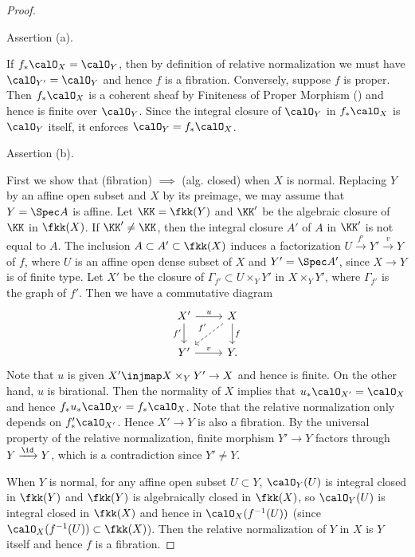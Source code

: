 \begin{proof}
	\hspace{1em}
	\begin{step}
		Assertion (a).
	\end{step}

	If $f_*\calO_X = \calO_Y$, then by definition of relative normalization we must have $\calO_{Y'} = \calO_Y$ and hence $f$ is a fibration.
	Conversely, suppose $f$ is proper.
	Then $f_*\calO_X$ is a coherent sheaf by Finiteness of Proper Morphism (\cite[\href{https://stacks.math.columbia.edu/tag/02O5}{Tag 02O5}]{Stacks}) and hence is finite over $\calO_Y$.
	Since the integral closure of $\calO_Y$ in $f_*\calO_X$ is $\calO_Y$ itself, it enforces $\calO_Y = f_*\calO_X$.

	\begin{step}
		Assertion (b).
	\end{step}

	First we show that (fibration) $\implies$ (alg. closed) when $X$ is normal.
	Replacing $Y$ by an affine open subset and $X$ by its preimage, we may assume that $Y = \Spec A$ is affine.
	Let $\KK = \fkk(Y)$ and $\KK'$ be the algebraic closure of $\KK$ in $\fkk(X)$.
	If $\KK' \neq \KK$, then the integral closure $A'$ of $A$ in $\KK'$ is not equal to $A$.
	The inclusion $A \subset A' \subset \fkk(X)$ induces a factorization $U \xrightarrow{f'} Y' \xrightarrow{v} Y$ of $f$, where $U$ is an affine open dense subset of $X$ and $Y' = \Spec A'$, since $X \to Y$ is of finite type.
	Let $X'$ be the closure of $\Gamma_{f'} \subset U \times_Y Y'$ in $X \times_Y Y'$, where $\Gamma_{f'}$ is the graph of $f'$.
	Then we have a commutative diagram
	\[
		\begin{tikzcd}
			X' \ar[r, "u"] \ar[d,"f'"'] & X \ar[d, "f"] \ar[ld, dashed, "f'"'] \\
			Y' \ar[r, "v"] & Y.
		\end{tikzcd}
	\]
	Note that $u$ is given $X' \injmap X \times_Y Y' \to X$ and hence is finite.
	On the other hand, $u$ is birational.
	Then the normality of $X$ implies that $u_* \calO_{X'} = \calO_X$ and hence $f_* u_* \calO_{X'} = f_* \calO_X$.
	Note that the relative normalization only depends on $f'_* \calO_{X'}$.
	Hence $X' \to Y$ is also a fibration.
	By the universal property of the relative normalization, finite morphism $Y' \to Y$ factors through $Y \xrightarrow{\id} Y$, which is a contradiction since $Y' \neq Y$.

	When $Y$ is normal, for any affine open subset $U \subset Y$, $\calO_Y(U)$ is integral closed in $\fkk(Y)$ and $\fkk(Y)$ is algebraically closed in $\fkk(X)$, so $\calO_Y(U)$ is integral closed in $\fkk(X)$ and hence in $\calO_X(f^{-1}(U))$ (since $\calO_X(f^{-1}(U)) \subset \fkk(X)$).
	Then the relative normalization of $Y$ in $X$ is $Y$ itself and hence $f$ is a fibration.
\end{proof}

